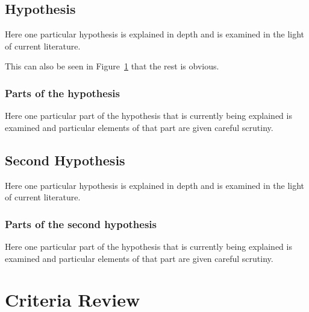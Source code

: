 \subsection{Hypothesis}

Here one particular hypothesis is explained in depth
and is examined in the light of current literature.

This can also be seen in Figure~\ref{moon} that the
rest is obvious.

\begin{figure}[h!tb] \centering

\vspace{ 2 in}
\label{moon}
\end{figure}

\subsubsection{Parts of the hypothesis}

Here one particular part of the hypothesis that is 
currently being explained is examined and particular
elements of that part are given careful scrutiny.


\subsection{Second Hypothesis}

Here one particular hypothesis is explained in depth
and is examined in the light of current literature.

\subsubsection{Parts of the second hypothesis}

Here one particular part of the hypothesis that is 
currently being explained is examined and particular
elements of that part are given careful scrutiny.

\section{Criteria Review}

